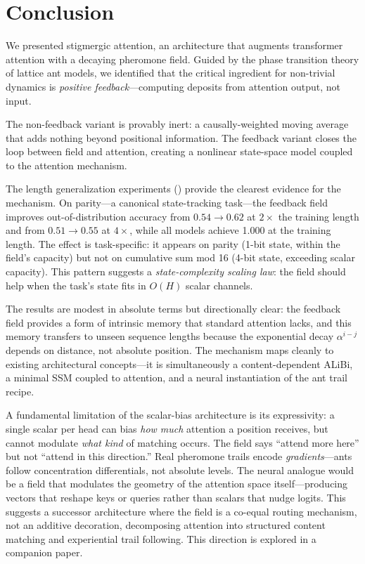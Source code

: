 \documentclass[11pt,a4paper]{article}
\newcommand{\retain}{\alpha}
\begin{document}
\section{Conclusion}
\label{sec:conclusion}

We presented stigmergic attention, an architecture that augments
transformer attention with a decaying pheromone field. Guided by the
phase transition theory of lattice ant models, we identified that the
critical ingredient for non-trivial dynamics is \emph{positive
feedback}---computing deposits from attention output, not input.

The non-feedback variant is provably inert: a causally-weighted
moving average that adds nothing beyond positional information.
The feedback variant closes the loop between field and attention,
creating a nonlinear state-space model coupled to the attention
mechanism.

The length generalization experiments () provide
the clearest evidence for the mechanism. On parity---a canonical
state-tracking task---the feedback field improves out-of-distribution
accuracy from $0.54 \to 0.62$ at $2\times$ the training length and
from $0.51 \to 0.55$ at $4\times$, while all models achieve 1.000
at the training length. The effect is task-specific: it appears on
parity (1-bit state, within the field's capacity) but not on
cumulative sum mod 16 (4-bit state, exceeding scalar capacity).
This pattern suggests a \emph{state-complexity scaling law}: the
field should help when the task's state fits in $O(H)$ scalar
channels.

The results are modest in absolute terms but directionally clear:
the feedback field provides a form of intrinsic memory that
standard attention lacks, and this memory transfers to unseen
sequence lengths because the exponential decay $\retain^{i-j}$
depends on distance, not absolute position. The mechanism maps
cleanly to existing architectural concepts---it is simultaneously a
content-dependent ALiBi, a minimal SSM coupled to attention, and
a neural instantiation of the ant trail recipe.

A fundamental limitation of the scalar-bias architecture is its
expressivity: a single scalar per head can bias \emph{how much}
attention a position receives, but cannot modulate \emph{what kind}
of matching occurs. The field says ``attend more here'' but not
``attend in this direction.'' Real pheromone trails encode
\emph{gradients}---ants follow concentration differentials, not
absolute levels. The neural analogue would be a field that modulates
the geometry of the attention space itself---producing vectors that
reshape keys or queries rather than scalars that nudge logits. This
suggests a successor architecture where the field is a co-equal
routing mechanism, not an additive decoration, decomposing attention
into structured content matching and experiential trail following.
This direction is explored in a companion paper.
\end{document}
